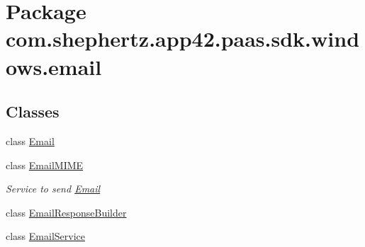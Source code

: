 \hypertarget{namespacecom_1_1shephertz_1_1app42_1_1paas_1_1sdk_1_1windows_1_1email}{\section{Package com.\+shephertz.\+app42.\+paas.\+sdk.\+windows.\+email}
\label{namespacecom_1_1shephertz_1_1app42_1_1paas_1_1sdk_1_1windows_1_1email}
}
\subsection*{Classes}
\begin{DoxyCompactItemize}
\item 
class \hyperlink{classcom_1_1shephertz_1_1app42_1_1paas_1_1sdk_1_1windows_1_1email_1_1_email}{Email}
\item 
class \hyperlink{classcom_1_1shephertz_1_1app42_1_1paas_1_1sdk_1_1windows_1_1email_1_1_email_m_i_m_e}{Email\+M\+I\+M\+E}
\begin{DoxyCompactList}\small\item\em Service to send \hyperlink{classcom_1_1shephertz_1_1app42_1_1paas_1_1sdk_1_1windows_1_1email_1_1_email}{Email} \end{DoxyCompactList}\item 
class \hyperlink{classcom_1_1shephertz_1_1app42_1_1paas_1_1sdk_1_1windows_1_1email_1_1_email_response_builder}{Email\+Response\+Builder}
\item 
class \hyperlink{classcom_1_1shephertz_1_1app42_1_1paas_1_1sdk_1_1windows_1_1email_1_1_email_service}{Email\+Service}
\end{DoxyCompactItemize}
